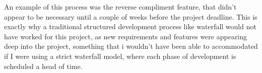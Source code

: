 An example of this process was the reverse compliment feature, that didn't appear to be necessary until a couple of weeks before the project deadline. This is exactly why a traditional structured development process like waterfall would not have worked for this project, as new requirements and features were appearing deep into the project, something that i wouldn't have been able to accommodated if I were using a strict waterfall model, where each phase of development is scheduled a head of time.


